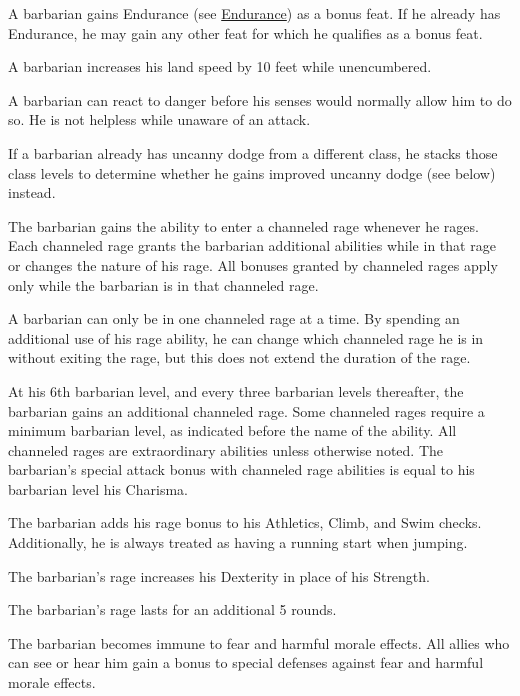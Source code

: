  A barbarian gains Endurance (see \hyperlink{feat:Endurance}{Endurance}) as a bonus feat. If he already has Endurance, he may gain any other feat for which he qualifies as a bonus feat.

 A barbarian increases his land speed by 10 feet while unencumbered.

 A barbarian can react to danger before his senses would normally allow him to do so. He is not helpless while unaware of an attack.

If a barbarian already has uncanny dodge from a different class, he stacks those class levels to determine whether he gains improved uncanny dodge (see below) instead.

 The barbarian gains the ability to enter a channeled rage whenever he rages. Each channeled rage grants the barbarian additional abilities while in that rage or changes the nature of his rage. All bonuses granted by channeled rages apply only while the barbarian is in that channeled rage.

A barbarian can only be in one channeled rage at a time. By spending an additional use of his rage ability, he can change which channeled rage he is in without exiting the rage, but this does not extend the duration of the rage.

At his 6th barbarian level, and every three barbarian levels thereafter, the barbarian gains an additional channeled rage. Some channeled rages require a minimum barbarian level, as indicated before the name of the ability. All channeled rages are extraordinary abilities unless otherwise noted. The barbarian's special attack bonus with channeled rage abilities is equal to his barbarian level \add his Charisma.

 The barbarian adds his rage bonus to his Athletics, Climb, and Swim checks. Additionally, he is always treated as having a running start when jumping.

 The barbarian's rage increases his Dexterity in place of his Strength.

 The barbarian's rage lasts for an additional 5 rounds.

 The barbarian becomes immune to fear and harmful morale effects. All allies who can see or hear him gain a  bonus to special defenses against fear and harmful morale effects.

